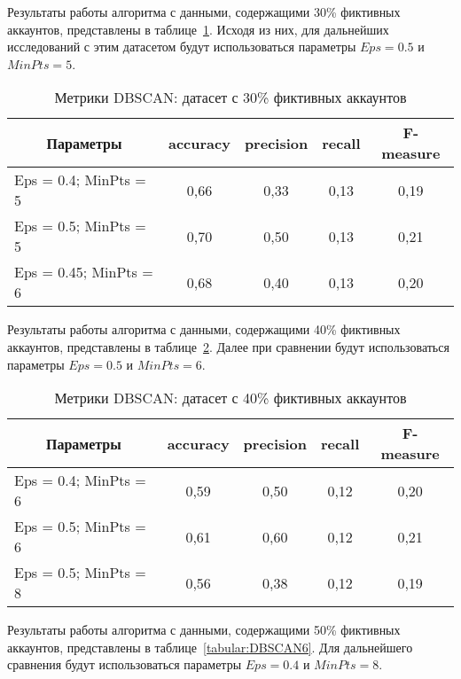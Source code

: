 Результаты работы алгоритма с данными, содержащими 30\% фиктивных аккаунтов, представлены в таблице~\ref{tabular:DBSCAN4}. Исходя из них, для дальнейших исследований с этим датасетом будут использоваться параметры $Eps = 0.5$ и $MinPts = 5$.

\begin{table}[H]
    \caption{Метрики DBSCAN: датасет с 30\% фиктивных аккаунтов}
    \vspace{1em}
    \small
    \begin{tabular}{|l|c|c|c|c|}
    \hline
    \multicolumn{1}{|c|}{\textbf{Параметры}} & \textbf{accuracy} & \textbf{precision} & \textbf{recall} & \textbf{F-measure} \\ \hline
    Eps = 0.4; MinPts = 5 & 0,66 & 0,33 & 0,13 & 0,19 \\ \hline
    Eps = 0.5; MinPts = 5 & 0,70 & 0,50 & 0,13 & 0,21 \\ \hline
    Eps = 0.45; MinPts = 6 & 0,68 & 0,40 & 0,13 & 0,20 \\ \hline
    \end{tabular}
    \label{tabular:DBSCAN4}
\end{table}


Результаты работы алгоритма с данными, содержащими 40\% фиктивных аккаунтов, представлены в таблице~\ref{tabular:DBSCAN5}. Далее при сравнении будут использоваться параметры $Eps = 0.5$ и $MinPts = 6$.

\begin{table}[H]
    \caption{Метрики DBSCAN: датасет с 40\% фиктивных аккаунтов}
    \vspace{1em}
    \small
    \begin{tabular}{|l|c|c|c|c|}
    \hline
    \multicolumn{1}{|c|}{\textbf{Параметры}} & \textbf{accuracy} & \textbf{precision} & \textbf{recall} & \textbf{F-measure} \\ \hline
    Eps = 0.4; MinPts = 6 & 0,59 & 0,50 & 0,12 & 0,20 \\ \hline
    Eps = 0.5; MinPts = 6 & 0,61 & 0,60 & 0,12 & 0,21 \\ \hline
    Eps = 0.5; MinPts = 8 & 0,56 & 0,38 & 0,12 & 0,19 \\ \hline
    \end{tabular}
    \label{tabular:DBSCAN5}
\end{table}


Результаты работы алгоритма с данными, содержащими 50\% фиктивных аккаунтов, представлены в таблице~\ref{tabular:DBSCAN6}. Для дальнейшего сравнения будут использоваться параметры $Eps = 0.4$ и $MinPts = 8$.

